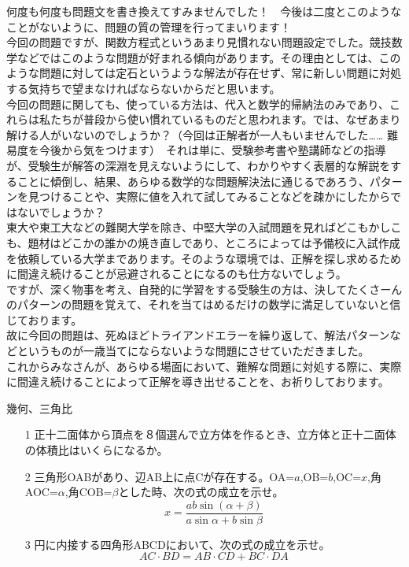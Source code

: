 \documentclass[a4paper,fleqn,dvipdfmx]{jsarticle}
\begin{document}
何度も何度も問題文を書き換えてすみませんでした！　今後は二度とこのようなことがないように、問題の質の管理を行ってまいります！\\
今回の問題ですが、関数方程式というあまり見慣れない問題設定でした。競技数学などではこのような問題が好まれる傾向があります。その理由としては、このような問題に対しては定石というような解法が存在せず、常に新しい問題に対処する気持ちで望まなければならないからだと思います。\\
今回の問題に関しても、使っている方法は、代入と数学的帰納法のみであり、これらは私たちが普段から使い慣れているものだと思われます。では、なぜあまり解ける人がいないのでしょうか？（今回は正解者が一人もいませんでした…… 難易度を今後から気をつけます）　それは単に、受験参考書や塾講師などの指導が、受験生が解答の深淵を見えないようにして、わかりやすく表層的な解説をすることに傾倒し、結果、あらゆる数学的な問題解決法に通じるであろう、パターンを見つけることや、実際に値を入れて試してみることなどを疎かにしたからではないでしょうか？\\
東大や東工大などの難関大学を除き、中堅大学の入試問題を見ればどこもかしこも、題材はどこかの誰かの焼き直しであり、ところによっては予備校に入試作成を依頼している大学まであります。そのような環境では、正解を探し求めるために間違え続けることが忌避されることになるのも仕方ないでしょう。\\
ですが、深く物事を考え、自発的に学習をする受験生の方は、決してたくさーんのパターンの問題を覚えて、それを当てはめるだけの数学に満足していないと信じております。\\
故に今回の問題は、死ぬほどトライアンドエラーを繰り返して、解法パターンなどというものが一歳当てにならないような問題にさせていただきました。\\
これからみなさんが、あらゆる場面において、難解な問題に対処する際に、実際に間違え続けることによって正解を導き出せることを、お祈りしております。




\newpage

\begin{itembox}[l]{幾何、三角比}

\begin{itemize}
    \item [1] 
    正十二面体から頂点を８個選んで立方体を作るとき、立方体と正十二面体の体積比はいくらになるか。
    \item [2] 
    三角形OABがあり、辺AB上に点Cが存在する。OA=$a$,OB=$b$,OC=$x$,角AOC=$\alpha$,角COB=$\beta$とした時、次の式の成立を示せ。
    $$x=\frac{ab\sin(\alpha+\beta)}{a\sin\alpha + b\sin\beta}$$
    \item [3] 
    円に内接する四角形ABCDにおいて、次の式の成立を示せ。
    $$AC\cdot BD=AB\cdot CD + BC\cdot DA$$
\end{itemize}

\end{itembox}
\end{document}
